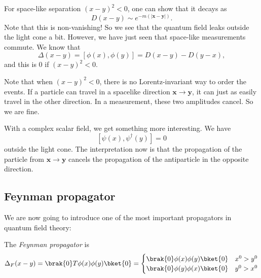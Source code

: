 \documentclass[a4paper]{article}
\begin{document}
For space-like separation $(x - y)^2 < 0$, one can show that it decays as
\[
  D(x - y) \sim e^{-m(|\mathbf{x} - \mathbf{y}|)}.
\]
Note that this is non-vanishing! So we see that the quantum field leaks outside the light cone a bit. However, we have just seen that space-like measurements commute. We know that
\[
  \Delta(x - y) = [\phi(x), \phi(y)] = D(x - y) - D(y - x),
\]
and this is $0$ if $(x - y)^2 < 0$.

Note that when $(x - y)^2 < 0$, there is no Lorentz-invariant way to order the events. If a particle can travel in a spacelike direction $\mathbf{x} \to \mathbf{y}$, it can just as easily travel in the other direction. In a measurement, these two amplitudes cancel. So we are fine.

With a complex scalar field, we get something more interesting. We have
\[
  [\psi(x), \psi^\dagger(y)] = 0
\]
outside the light cone. The interpretation now is that the propagation of the particle from $\mathbf{x} \to \mathbf{y}$ cancels the propagation of the antiparticle in the opposite direction.

\subsection{Feynman propagator}

We are now going to introduce one of the most important propagators in quantum field theory:
\begin{defi}
  The \emph{Feynman propagator} is
  \[
    \Delta_F (x - y) = \brak{0} T \phi(x) \phi(y) \bket{0} =
    \begin{cases}
      \brak{0} \phi(x) \phi(y) \bket{0} & x^0 > y^0\\
      \brak{0} \phi(y) \phi(x) \bket{0} & y^0 > x^0
    \end{cases}
  \]
\end{defi}
\end{document}
